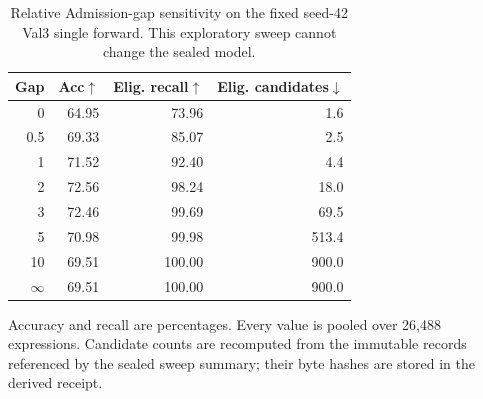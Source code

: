 \begin{table}[t]
\centering
\caption{Relative Admission-gap sensitivity on the fixed seed-42 Val3 single forward. This exploratory sweep cannot change the sealed model.}
\label{tab:supp-gap}
\scriptsize
\setlength{\tabcolsep}{5pt}
\begin{tabular}{rrrr}\toprule
Gap & Acc$\uparrow$ & Elig. recall$\uparrow$ & Elig. candidates$\downarrow$\\\midrule
0 & 64.95 & 73.96 & 1.6 \\
0.5 & 69.33 & 85.07 & 2.5 \\
1 & 71.52 & 92.40 & 4.4 \\
2 & 72.56 & 98.24 & 18.0 \\
3 & 72.46 & 99.69 & 69.5 \\
5 & 70.98 & 99.98 & 513.4 \\
10 & 69.51 & 100.00 & 900.0 \\
$\infty$ & 69.51 & 100.00 & 900.0 \\
\bottomrule\end{tabular}

\parbox{0.96\columnwidth}{\scriptsize Accuracy and recall are percentages. Every value is pooled over 26,488 expressions. Candidate counts are recomputed from the immutable records referenced by the sealed sweep summary; their byte hashes are stored in the derived receipt.}
\end{table}
